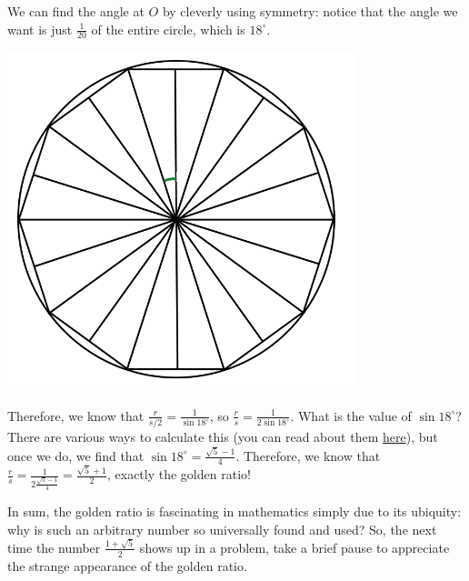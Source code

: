 \documentclass{article}
\begin{document}
We can find the angle at $O$ by cleverly using symmetry: notice that the angle we want is just $\frac1{20}$ of the entire circle, which is $18^\circ$.

\begin{center}
    \includegraphics[width=4in]{images/golden-ratio5.png}
\end{center}

Therefore, we know that $\frac{r}{s/2} = \frac1{\sin 18^\circ}$, so $\frac rs = \frac1{2\sin 18^\circ}$. What is the value of $\sin 18^\circ$? There are various ways to calculate this (you can read about them \href{https://math.stackexchange.com/questions/2140356/various-methods-to-find-value-of-sin-18-circ}{here}), but once we do, we find that $\sin 18^\circ = \frac{\sqrt5-1}4$. Therefore, we know that $\frac rs = \frac1{2\frac{\sqrt5-1}4} = \frac{\sqrt5+1}2$, exactly the golden ratio!

In sum, the golden ratio is fascinating in mathematics simply due to its ubiquity: why is such an arbitrary number so universally found and used? So, the next time the number $\frac{1+\sqrt5}2$ shows up in a problem, take a brief pause to appreciate the strange appearance of the golden ratio.
\end{document}
